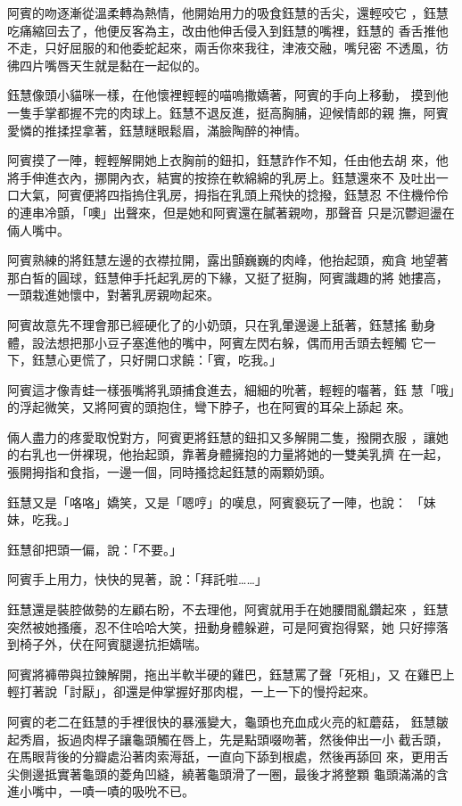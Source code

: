 阿賓的吻逐漸從溫柔轉為熱情，他開始用力的吸食鈺慧的舌尖，還輕咬它
，鈺慧吃痛縮回去了，他便反客為主，改由他伸舌侵入到鈺慧的嘴裡，鈺慧的
香舌推他不走，只好屈服的和他委蛇起來，兩舌你來我往，津液交融，嘴兒密
不透風，彷彿四片嘴唇天生就是黏在一起似的。

鈺慧像頭小貓咪一樣，在他懷裡輕輕的喵嗚撒嬌著，阿賓的手向上移動，
摸到他一隻手掌都握不完的肉球上。鈺慧不退反進，挺高胸脯，迎候情郎的親
撫，阿賓愛憐的推揉捏拿著，鈺慧瞇眼鬆眉，滿臉陶醉的神情。

阿賓摸了一陣，輕輕解開她上衣胸前的鈕扣，鈺慧詐作不知，任由他去胡
來，他將手伸進衣內，挪開內衣，結實的按捺在軟綿綿的乳房上。鈺慧還來不
及吐出一口大氣，阿賓便將四指摀住乳房，拇指在乳頭上飛快的捻撥，鈺慧忍
不住機伶伶的連串冷顫，「噢」出聲來，但是她和阿賓還在膩著親吻，那聲音
只是沉鬱迴盪在倆人嘴中。

阿賓熟練的將鈺慧左邊的衣襟拉開，露出顫巍巍的肉峰，他抬起頭，痴貪
地望著那白皙的圓球，鈺慧伸手托起乳房的下緣，又挺了挺胸，阿賓識趣的將
她摟高，一頭栽進她懷中，對著乳房親吻起來。

阿賓故意先不理會那已經硬化了的小奶頭，只在乳暈邊邊上舐著，鈺慧搖
動身體，設法想把那小豆子塞進他的嘴中，阿賓左閃右躲，偶而用舌頭去輕觸
它一下，鈺慧心更慌了，只好開口求饒：「賓，吃我。」

阿賓這才像青蛙一樣張嘴將乳頭捕食進去，細細的吮著，輕輕的囓著，鈺
慧「哦」的浮起微笑，又將阿賓的頭抱住，彎下脖子，也在阿賓的耳朵上舔起
來。

倆人盡力的疼愛取悅對方，阿賓更將鈺慧的鈕扣又多解開二隻，撥開衣服
，讓她的右乳也一併裸現，他抬起頭，靠著身體擁抱的力量將她的一雙美乳擠
在一起，張開拇指和食指，一邊一個，同時搔捻起鈺慧的兩顆奶頭。

鈺慧又是「咯咯」嬌笑，又是「嗯哼」的嘆息，阿賓褻玩了一陣，也說：
「妹妹，吃我。」

鈺慧卻把頭一偏，說：「不要。」

阿賓手上用力，快快的晃著，說：「拜託啦……」

鈺慧還是裝腔做勢的左顧右盼，不去理他，阿賓就用手在她腰間亂鑽起來
，鈺慧突然被她搔癢，忍不住哈哈大笑，扭動身體躲避，可是阿賓抱得緊，她
只好擰落到椅子外，伏在阿賓腿邊抗拒嬌喘。

阿賓將褲帶與拉鍊解開，拖出半軟半硬的雞巴，鈺慧罵了聲「死相」，又
在雞巴上輕打著說「討厭」，卻還是伸掌握好那肉棍，一上一下的慢捋起來。

阿賓的老二在鈺慧的手裡很快的暴漲變大，龜頭也充血成火亮的紅蘑菇，
鈺慧皺起秀眉，扳過肉桿子讓龜頭觸在唇上，先是點頭啜吻著，然後伸出一小
截舌頭，在馬眼背後的分瓣處沿著肉索溽舐，一直向下舔到根處，然後再舔回
來，更用舌尖側邊抵實著龜頭的菱角凹縫，繞著龜頭滑了一圈，最後才將整顆
龜頭滿滿的含進小嘴中，一嘖一嘖的吸吮不已。

